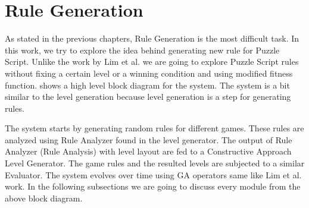 \section{Rule Generation}
As stated in the previous chapters, Rule Generation is the most difficult task. In this work, we try to explore the idea behind generating new rule for Puzzle Script. Unlike the work by Lim et al.\cite{puzzleScriptGeneration} we are going to explore Puzzle Script rules without fixing a certain level or a winning condition and using modified fitness function.  shows a high level block diagram for the system. The system is a bit similar to the level generation because level generation is a step for generating rules.


The system starts by generating random rules for different games. These rules are analyzed using Rule Analyzer found in the level generator. The output of Rule Analyzer (Rule Analysis) with level layout are fed to a Constructive Approach Level Generator. The game rules and the resulted levels are subjected to a similar Evaluator. The system evolves over time using GA operators same like Lim et al. work\cite{puzzleScriptGeneration}. In the following subsections we are going to discuss every module from the above block diagram.

